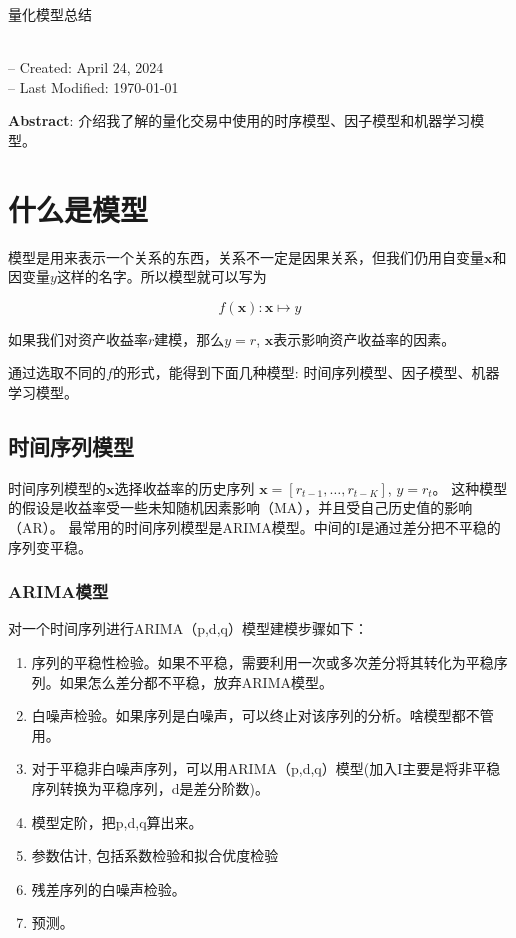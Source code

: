\documentclass[11pt,oneside,a4paper,notitlepage]{article}
\newcommand{\vect}[1]{\mathbf{#1}}
\begin{document}
\begin{CJK}{UTF8}{gbsn}
\begin{center} 
\begin{Large}
量化模型总结
\end{Large}
\\
\vspace{4mm}
\vspace{0.5em}
-- Created: April 24, 2024 \\
-- Last Modified: \today
\end{center}
\vspace{2em}
\textbf{Abstract}: 介绍我了解的量化交易中使用的时序模型、因子模型和机器学习模型。 

\section{什么是模型}
模型是用来表示一个关系的东西，关系不一定是因果关系，但我们仍用自变量$\vect x$和因变量$y$这样的名字。所以模型就可以写为 

\begin{equation}
  f(\vect x): \vect x\mapsto y
\end{equation}

如果我们对资产收益率$r$建模，那么$y = r$, $\vect x$表示影响资产收益率的因素。

通过选取不同的$f$的形式，能得到下面几种模型: 时间序列模型、因子模型、机器学习模型。

\subsection{时间序列模型}
时间序列模型的$\vect x$选择收益率的历史序列 $\vect x = \left[r_{t-1}, \ldots, r_{t-K} \right]$, $y = r_t$。
这种模型的假设是收益率受一些未知随机因素影响（MA），并且受自己历史值的影响（AR）。 最常用的时间序列模型是ARIMA模型。中间的I是通过差分把不平稳的序列变平稳。
\subsubsection{ARIMA模型}
对一个时间序列进行ARIMA（p,d,q）模型建模步骤如下：
\begin{enumerate}
\item 序列的平稳性检验。如果不平稳，需要利用一次或多次差分将其转化为平稳序列。如果怎么差分都不平稳，放弃ARIMA模型。
\item 白噪声检验。如果序列是白噪声，可以终止对该序列的分析。啥模型都不管用。
\item 对于平稳非白噪声序列，可以用ARIMA（p,d,q）模型(加入I主要是将非平稳序列转换为平稳序列，d是差分阶数)。
\item 模型定阶，把p,d,q算出来。
\item 参数估计, 包括系数检验和拟合优度检验
\item 残差序列的白噪声检验。
\item 预测。
\end{enumerate}


\end{CJK}
\end{document}
